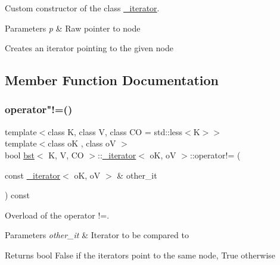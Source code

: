 Custom constructor of the class \hyperlink{classbst_1_1__iterator}{\+\_\+iterator}. 


\begin{DoxyParams}{Parameters}
{\em p} & Raw pointer to node\\
\hline
\end{DoxyParams}
Creates an iterator pointing to the given node 

\subsection{Member Function Documentation}
\mbox{\label{classbst_1_1__iterator_a686ce4f61f2b00e175e68c0946f3343b}} 
\subsubsection{\texorpdfstring{operator"!=()}{operator!=()}\hspace{0.1cm}{\footnotesize\ttfamily [1/2]}}
{\footnotesize\ttfamily template$<$class K, class V, class CO = std\+::less$<$\+K$>$$>$ \\
template$<$class oK , class oV $>$ \\
bool \hyperlink{classbst}{bst}$<$ K, V, CO $>$\+::\hyperlink{classbst_1_1__iterator}{\+\_\+iterator}$<$ oK, oV $>$\+::operator!= (\begin{DoxyParamCaption}\item[{const \hyperlink{classbst_1_1__iterator}{\+\_\+iterator}$<$ oK, oV $>$ \&}]{other\+\_\+it }\end{DoxyParamCaption}) const\hspace{0.3cm}{\ttfamily [inline]}}



Overload of the operator !=. 


\begin{DoxyParams}{Parameters}
{\em other\+\_\+it} & Iterator to be compared to \\
\hline
\end{DoxyParams}
\begin{DoxyReturn}{Returns}
bool False if the iterators point to the same node, True otherwise 
\end{DoxyReturn}
\mbox{\label{classbst_1_1__iterator_a686ce4f61f2b00e175e68c0946f3343b}} 
